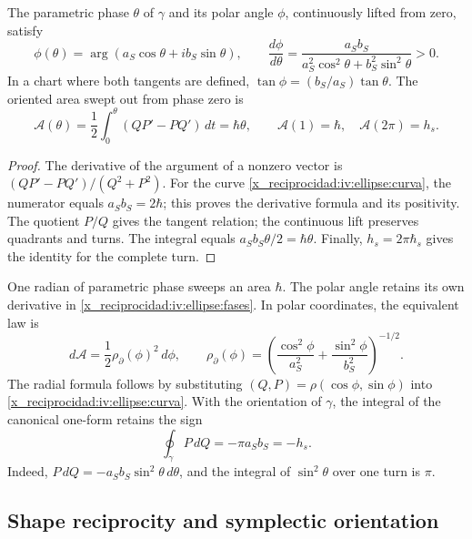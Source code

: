 \begin{proposition}
\label{x_reciprocidad:iv:ellipse:ley-areal}
The parametric phase \(\theta\) of \(\gamma\) and its polar
angle \(\phi\), continuously lifted from zero, satisfy
\begin{equation}
 \phi(\theta)=\arg(a_S\cos\theta+i b_S\sin\theta),\qquad
 \frac{d\phi}{d\theta}
 =\frac{a_Sb_S}{a_S^2\cos^2\theta+b_S^2\sin^2\theta}>0.
 \label{x_reciprocidad:iv:ellipse:fases}
\end{equation}
In a chart where both tangents are defined,
\(\tan\phi=(b_S/a_S)\tan\theta\). The oriented area swept out
from phase zero is
\begin{equation}
 \mathcal A(\theta)=
 \frac12\int_0^\theta(QP'-PQ')\,dt=\hbar\theta,
 \qquad
 \mathcal A(1)=\hbar,\quad\mathcal A(2\pi)=h_s.
 \label{x_reciprocidad:iv:ellipse:area-fase}
\end{equation}
\end{proposition}
\begin{proof}
The derivative of the argument of a nonzero vector is
\((QP'-PQ')/(Q^2+P^2)\). For the curve
\eqref{x_reciprocidad:iv:ellipse:curva}, the numerator equals
\(a_Sb_S=2\hbar\); this proves the derivative formula and its
positivity. The quotient \(P/Q\) gives the tangent relation;
the continuous lift preserves quadrants and turns.
The integral equals \(a_Sb_S\theta/2=\hbar\theta\).
Finally, \(h_s=2\pi\hbar_s\) gives the identity for
the complete turn.
\end{proof}

One radian of parametric phase sweeps an area \(\hbar\). The polar
angle retains its own derivative in
\eqref{x_reciprocidad:iv:ellipse:fases}. In polar coordinates, the equivalent
law is
\[
 d\mathcal A=\frac12\rho_{\partial}(\phi)^2\,d\phi,\qquad
 \rho_{\partial}(\phi)=
 \left(\frac{\cos^2\phi}{a_S^2}
       +\frac{\sin^2\phi}{b_S^2}\right)^{-1/2}.
\]
The radial formula follows by substituting
\((Q,P)=\rho(\cos\phi,\sin\phi)\) into
\eqref{x_reciprocidad:iv:ellipse:curva}. With the orientation of
\(\gamma\), the integral of the canonical one-form retains
the sign
\begin{equation}
 \oint_\gamma P\,dQ=-\pi a_Sb_S=-h_s.
 \label{x_reciprocidad:iv:ellipse:accion-orientada}
\end{equation}
Indeed, \(P\,dQ=-a_Sb_S\sin^2\theta\,d\theta\), and
the integral of \(\sin^2\theta\) over one turn is \(\pi\).

\subsection{Shape reciprocity and symplectic orientation}
\label{x_reciprocidad:iv:ellipse:reciprocidad}

